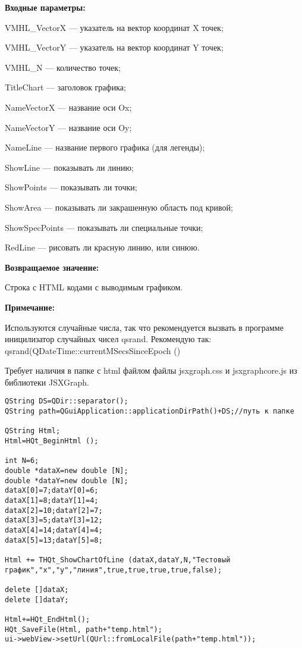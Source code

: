 \documentclass[a4paper,12pt]{article}
\begin{document}
\textbf{Входные параметры:}
 
    VMHL\_VectorX --- указатель на вектор координат X точек;
 
    VMHL\_VectorY --- указатель на вектор координат Y точек;
 
    VMHL\_N --- количество точек;
 
    TitleChart --- заголовок графика;
 
    NameVectorX --- название оси Ox;
 
    NameVectorY --- название оси Oy;
 
    NameLine --- название первого графика (для легенды);
 
    ShowLine --- показывать ли линию;
 
    ShowPoints --- показывать ли точки;
 
    ShowArea --- показывать ли закрашенную область под кривой;
 
    ShowSpecPoints --- показывать ли специальные точки;
 
    RedLine --- рисовать ли красную линию, или синюю.

\textbf{Возвращаемое значение:}

Строка с HTML кодами с выводимым графиком.

\textbf{Примечание:}

Используются случайные числа, так что рекомендуется вызвать в программе иницилизатор случайных чисел qsrand. Рекомендую так: qsrand(QDateTime::currentMSecsSinceEpoch () %

Требует наличия в папке с html файлом файлы jsxgraph.css и jsxgraphcore.js из библиотеки JSXGraph.


\begin{lstlisting}[label=code_use_THQt_ShowChartOfLine,caption=Пример использования]
QString DS=QDir::separator();
QString path=QGuiApplication::applicationDirPath()+DS;//путь к папке

QString Html;
Html=HQt_BeginHtml ();

int N=6;
double *dataX=new double [N];
double *dataY=new double [N];
dataX[0]=7;dataY[0]=6;
dataX[1]=8;dataY[1]=4;
dataX[2]=10;dataY[2]=7;
dataX[3]=5;dataY[3]=12;
dataX[4]=14;dataY[4]=4;
dataX[5]=13;dataY[5]=8;

Html += THQt_ShowChartOfLine (dataX,dataY,N,"Тестовый график","x","y","линия",true,true,true,true,false);

delete []dataX;
delete []dataY;

Html+=HQt_EndHtml();
HQt_SaveFile(Html, path+"temp.html");
ui->webView->setUrl(QUrl::fromLocalFile(path+"temp.html"));
\end{lstlisting}
\end{document}
